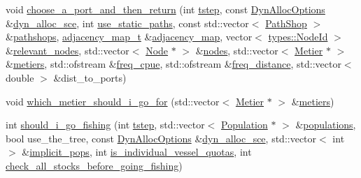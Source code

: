 \begin{DoxyCompactItemize}
void \mbox{\hyperlink{class_vessel_a88fd9bd55e3ca8312d00adea41db2894}{choose\+\_\+a\+\_\+port\+\_\+and\+\_\+then\+\_\+return}} (int \mbox{\hyperlink{thread__vessels_8cpp_a84bc73d278de929ec9974e1a95d9b23a}{tstep}}, const \mbox{\hyperlink{class_dyn_alloc_options}{Dyn\+Alloc\+Options}} \&\mbox{\hyperlink{thread__vessels_8cpp_a8389f6b9261a2039cabeecc230207043}{dyn\+\_\+alloc\+\_\+sce}}, int \mbox{\hyperlink{thread__vessels_8cpp_a47c8128a8da7af20c2aab95990bcb2dc}{use\+\_\+static\+\_\+paths}}, const std\+::vector$<$ \mbox{\hyperlink{class_path_shop}{Path\+Shop}} $>$ \&\mbox{\hyperlink{thread__vessels_8cpp_a1d6e93fdf06dc624480583be2cdd0748}{pathshops}}, \mbox{\hyperlink{myutils_8h_ae689dbcb43e66abf9a513718b83bd87d}{adjacency\+\_\+map\+\_\+t}} \&\mbox{\hyperlink{thread__vessels_8cpp_ada1040d49789f59db85b5c6096b3313d}{adjacency\+\_\+map}}, vector$<$ \mbox{\hyperlink{classtypes_1_1_node_id}{types\+::\+Node\+Id}} $>$ \&\mbox{\hyperlink{thread__vessels_8cpp_a805aea562dce0ee8a65d4cdb26f3f1ae}{relevant\+\_\+nodes}}, std\+::vector$<$ \mbox{\hyperlink{class_node}{Node}} $\ast$ $>$ \&\mbox{\hyperlink{thread__vessels_8cpp_ace5675146c8515428d094fd142d8a2d2}{nodes}}, std\+::vector$<$ \mbox{\hyperlink{class_metier}{Metier}} $\ast$ $>$ \&\mbox{\hyperlink{thread__vessels_8cpp_add976a96f7a0f5c20f5314d72234c427}{metiers}}, std\+::ofstream \&\mbox{\hyperlink{thread__vessels_8cpp_ad541b5d62baa9ad6aec2c8cbefaa3b9a}{freq\+\_\+cpue}}, std\+::ofstream \&\mbox{\hyperlink{thread__vessels_8cpp_a0eea96bfd17303c2c899a08bb2c9d35e}{freq\+\_\+distance}}, std\+::vector$<$ double $>$ \&dist\+\_\+to\+\_\+ports)
\item 
void \mbox{\hyperlink{class_vessel_a55d8cc09a432108987440f83a1366852}{which\+\_\+metier\+\_\+should\+\_\+i\+\_\+go\+\_\+for}} (std\+::vector$<$ \mbox{\hyperlink{class_metier}{Metier}} $\ast$ $>$ \&\mbox{\hyperlink{thread__vessels_8cpp_add976a96f7a0f5c20f5314d72234c427}{metiers}})
\item 
int \mbox{\hyperlink{class_vessel_a1c1dea503bfcc8698f3ee7f06dadd0e9}{should\+\_\+i\+\_\+go\+\_\+fishing}} (int \mbox{\hyperlink{thread__vessels_8cpp_a84bc73d278de929ec9974e1a95d9b23a}{tstep}}, std\+::vector$<$ \mbox{\hyperlink{class_population}{Population}} $\ast$ $>$ \&\mbox{\hyperlink{thread__vessels_8cpp_a52b340841e812112c424c384bb9e7ebc}{populations}}, bool use\+\_\+the\+\_\+tree, const \mbox{\hyperlink{class_dyn_alloc_options}{Dyn\+Alloc\+Options}} \&\mbox{\hyperlink{thread__vessels_8cpp_a8389f6b9261a2039cabeecc230207043}{dyn\+\_\+alloc\+\_\+sce}}, std\+::vector$<$ int $>$ \&\mbox{\hyperlink{thread__vessels_8cpp_a249b6522d595e6a057580471ab5a4517}{implicit\+\_\+pops}}, int \mbox{\hyperlink{thread__vessels_8cpp_ae2836a05a7b3b65a0cc12d46c45106cc}{is\+\_\+individual\+\_\+vessel\+\_\+quotas}}, int \mbox{\hyperlink{thread__vessels_8cpp_a7cafd21963997900577877c8c45a9e46}{check\+\_\+all\+\_\+stocks\+\_\+before\+\_\+going\+\_\+fishing}})

\end{DoxyCompactItemize}
